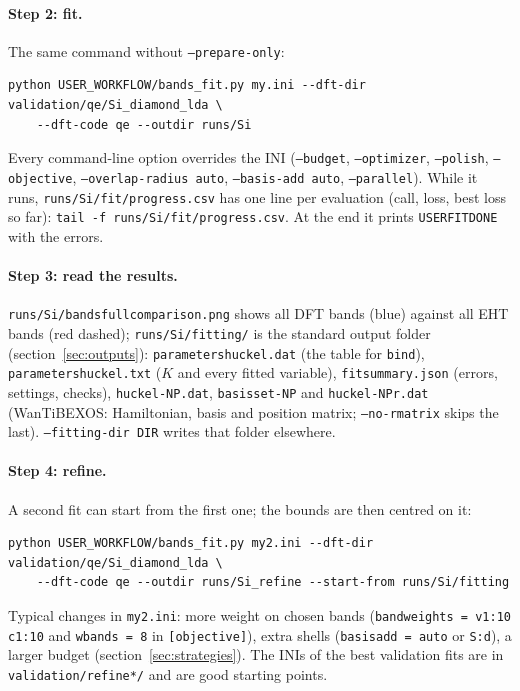 \documentclass[11pt,a4paper]{article}
\newcommand{\cmd}[1]{\texttt{#1}}
\renewcommand{\_}{\origunderscore\allowbreak}
\begin{document}
\paragraph{Step 2: fit.} The same command without \cmd{--prepare-only}:
\begin{lstlisting}[style=sh]
python USER_WORKFLOW/bands_fit.py my.ini --dft-dir validation/qe/Si_diamond_lda \
    --dft-code qe --outdir runs/Si
\end{lstlisting}
Every command-line option overrides the INI (\cmd{--budget}, \cmd{--optimizer}, \cmd{--polish}, \cmd{--objective},
\cmd{--overlap-radius auto}, \cmd{--basis-add auto}, \cmd{--parallel}). While it runs, \cmd{runs/Si/fit/progress.csv} has one line
per evaluation (call, loss, best loss so far): \cmd{tail -f runs/Si/fit/progress.csv}. At the end it prints \cmd{USER\_FIT\_DONE}
with the errors.

\paragraph{Step 3: read the results.} \cmd{runs/Si/bands\_full\_comparison.png} shows all DFT bands (blue) against all EHT bands
(red dashed); \cmd{runs/Si/fitting/} is the standard output folder (section~\ref{sec:outputs}): \cmd{parameters\_huckel.dat}
(the table for \cmd{bind}), \cmd{parameters\_huckel.txt} ($K$ and every fitted variable), \cmd{fit\_summary.json} (errors,
settings, checks), \cmd{huckel-NP.dat}, \cmd{basis\_set-NP} and \cmd{huckel-NP\_r.dat} (WanTiBEXOS: Hamiltonian, basis and
position matrix; \cmd{--no-rmatrix} skips the last). \cmd{--fitting-dir DIR} writes that folder
elsewhere.

\paragraph{Step 4: refine.} A second fit can start from the first one; the bounds are then centred on it:
\begin{lstlisting}[style=sh]
python USER_WORKFLOW/bands_fit.py my2.ini --dft-dir validation/qe/Si_diamond_lda \
    --dft-code qe --outdir runs/Si_refine --start-from runs/Si/fitting
\end{lstlisting}
Typical changes in \cmd{my2.ini}: more weight on chosen bands (\cmd{band\_weights = v1:10 c1:10} and \cmd{w\_bands = 8} in
\cmd{[objective]}), extra shells (\cmd{basis\_add = auto} or \cmd{S:d}), a larger budget (section~\ref{sec:strategies}). The
INIs of the best validation fits are in \cmd{validation/refine*/} and are good starting points.
\end{document}

